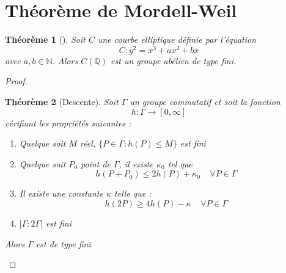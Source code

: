 \documentclass[a4paper]{article}
\newtheorem{theorem}{Théorème}
\begin{document}
\newpage
\section{Théorème de Mordell-Weil}
\begin{theorem}[\cite{ref5}]
Soit $C$ une courbe elliptique définie par l'équation
\begin{equation*}
C : y^2=x^3+ax^2+bx
\end{equation*}
avec $a,b \in \mathbb{N}$. Alors $C(\mathbb{Q})$ est un groupe abélien de type fini.
\end{theorem}


\begin{proof}

\begin{theorem}[Descente]
Soit $\Gamma$ un groupe commutatif et soit la fonction
\begin{equation*}
h : \Gamma \rightarrow [0, \infty]
\end{equation*}
vérifiant les propriétés suivantes : 
\begin{enumerate}
\item Quelque soit $M$ réel, $\{P \in \Gamma : h(P) \leqslant M\}$ est fini
\item Quelque soit $P_{0}$ point de $\Gamma$, il existe $\kappa_{0}$ tel que 
\begin{equation*}
h(P+P_{0}) \leqslant 2h(P) + \kappa_{0} \; \; \; \; \forall P \in \Gamma   
\end{equation*}
\item Il existe une constante $\kappa$ telle que :
\begin{equation*}
h(2P) \geqslant 4h(P) - \kappa \; \; \; \; \forall P \in \Gamma 
\end{equation*}
\item  $|\Gamma:2\Gamma|$ est fini
\end{enumerate}
Alors $\Gamma$ est de type fini
\end{theorem}


\end{proof}
\end{document}
